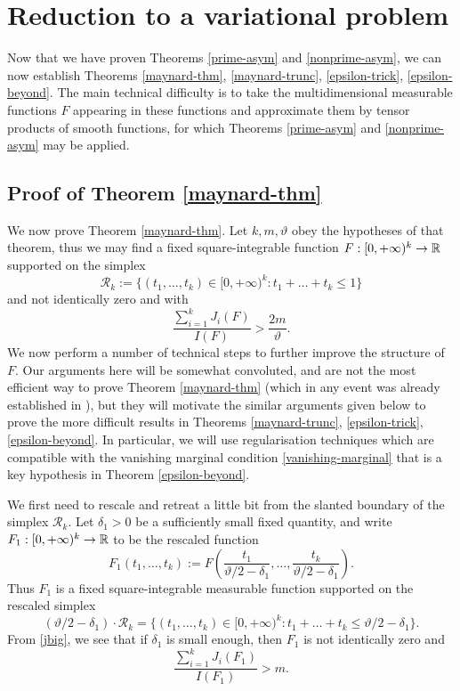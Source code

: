 \section{Reduction to a variational problem}\label{variational-sec}

Now that we have proven Theorems \ref{prime-asym} and \ref{nonprime-asym}, we can now establish Theorems \ref{maynard-thm}, \ref{maynard-trunc}, \ref{epsilon-trick}, \ref{epsilon-beyond}.  The main technical difficulty is to take the multidimensional measurable functions $F$ appearing in these functions and approximate them by tensor products of smooth functions, for which Theorems \ref{prime-asym} and \ref{nonprime-asym} may be applied.

\subsection{Proof of Theorem \ref{maynard-thm}}\label{may-sec}

We now prove Theorem \ref{maynard-thm}.  Let $k, m, \vartheta$ obey the hypotheses of that theorem, thus we may find a fixed square-integrable function $F: [0,+\infty)^k \to \mathbb{R}$ supported on the simplex
$$ {\mathcal R}_k := \{ (t_1,\dots,t_k) \in [0,+\infty)^k: t_1+\dots+t_k \leq 1 \}$$
and not identically zero and with
\begin{equation}\label{jbig}
 \frac{\sum_{i=1}^k J_i(F)}{I(F)} > \frac{2m}{\vartheta}.
\end{equation}
We now perform a number of technical steps to further improve the structure of $F$.  Our arguments here will be somewhat convoluted, and are not the most efficient way to prove Theorem \ref{maynard-thm} (which in any event was already established in \cite{maynard-new}), but they will motivate the similar arguments given below to prove the more difficult results in Theorems \ref{maynard-trunc}, \ref{epsilon-trick}, \ref{epsilon-beyond}.  In particular, we will use regularisation techniques which are compatible with the vanishing marginal condition \eqref{vanishing-marginal} that is a key hypothesis in Theorem \ref{epsilon-beyond}.

We first need to rescale and retreat a little bit from the slanted boundary of the simplex ${\mathcal R}_k$.
Let $\delta_1 > 0$ be a sufficiently small fixed quantity, and write $F_1: [0,+\infty)^k \to \mathbb{R}$ to be the rescaled function
$$ F_1(t_1,\dots,t_k) := F( \frac{t_1}{\vartheta/2-\delta_1}, \dots, \frac{t_k}{\vartheta/2-\delta_1} ).$$
Thus $F_1$ is a fixed square-integrable measurable function supported on the rescaled simplex
$$ (\vartheta/2-\delta_1) \cdot {\mathcal R}_k = \{ (t_1,\dots,t_k) \in [0,+\infty)^k: t_1+\dots+t_k \leq \vartheta/2-\delta_1 \}.$$
From \eqref{jbig}, we see that if $\delta_1$ is small enough, then $F_1$ is not identically zero and
\begin{equation}\label{jbig-2}
 \frac{\sum_{i=1}^k J_i(F_1)}{I(F_1)} > m.
\end{equation}

